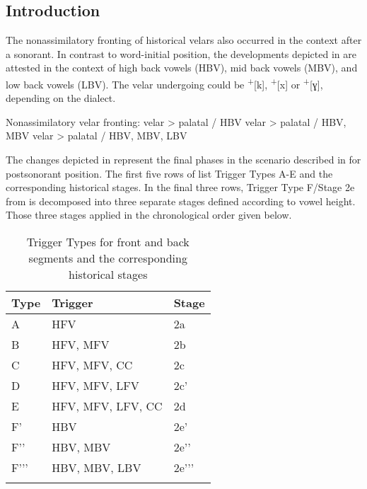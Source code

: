 \subsection{Introduction}\label{sec:14.3.1}

The nonassimilatory fronting of historical velars also occurred in the context after a sonorant. In contrast to word-initial position, the developments depicted in  are attested in the context of high back vowels (HBV), mid back vowels (MBV), and low back vowels (LBV). The velar undergoing   could be  \textsuperscript{+}[k], \textsuperscript{+}[x] or \textsuperscript{+}[ɣ], depending on the dialect.

\ea%
\label{ex:14:24}Nonassimilatory velar fronting:
\ea\label{ex:14:24a} velar > palatal / HBV {\longrule}{\longrule}
\ex\label{ex:14:24b} velar > palatal / HBV, MBV {\longrule}{\longrule}
\ex\label{ex:14:24c} velar > palatal / HBV, MBV, LBV {\longrule}{\longrule}
\z
\z 

The changes depicted in  represent the final phases in the  scenario described in  for postsonorant position. The first five rows of  list Trigger Types A-E and the corresponding historical stages. In the final three rows, Trigger Type F/Stage 2e from  is decomposed into three separate stages defined according to vowel height. Those three stages applied in the chronological order given below.

\begin{table}
\caption{Trigger Types for front and back segments and the corresponding historical stages\label{tab:14:4}}
\begin{tabular}{lll}
\lsptoprule
Type & Trigger & Stage\\\midrule
A & HFV & 2a\\
B & HFV, MFV & 2b\\
C & HFV, MFV, CC & 2c\\
D & HFV, MFV, LFV & 2c'\\
E & HFV, MFV, LFV, CC & 2d\\\tablevspace
F' & HBV & 2e'\\
F'{}' & HBV, MBV & 2e'{}'\\
F'{}'{}' & HBV, MBV, LBV & 2e'{}'{}'\\
\lspbottomrule
\end{tabular}
\end{table}

